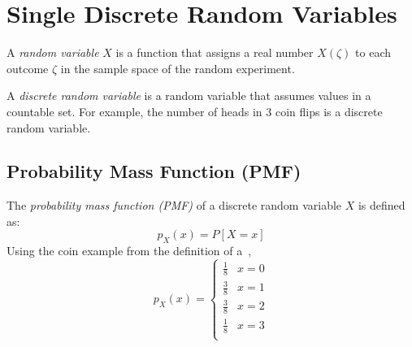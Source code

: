 \section{Single Discrete Random Variables} \label{sec:Single Discrete Random Variables}
	\begin{definition} \label{def:Random Variable, Simple}
		A \emph{random variable} $X$ is a function that assigns a real number $X \left( \zeta \right)$ to each outcome $\zeta$ in the sample space of the random experiment.
	\end{definition}
	\begin{definition} \label{def:Discrete Random Variable}
		A \emph{discrete random variable} is a random variable that assumes values in a countable set. For example, the number of heads in 3 coin flips is a discrete random variable.
	\end{definition}

	\subsection{Probability Mass Function  (PMF)} \label{subsec:Probability Mass Function}
		\begin{definition} \label{def:Probability Mass Function}
			The \emph{probability mass function (PMF)} of a discrete random variable $X$ is defined as:
			\begin{equation} \label{eq:Probability Mass Function}
				p_{X} \left( x \right) = P \left[ X=x \right]
			\end{equation}
			Using the coin example from the definition of a~,
			\begin{equation}
				p_{X} \left( x \right) = 
				\begin{cases}
					\frac{1}{8} & x=0 \\
					\frac{3}{8} & x=1 \\
					\frac{3}{8} & x=2 \\
					\frac{1}{8} & x=3 \\
				\end{cases}
			\end{equation}
		\end{definition}
		

